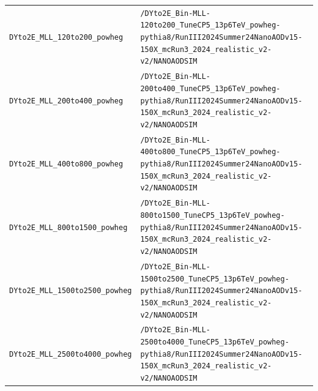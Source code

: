 \begin{longtable}{@{}>{\RaggedRight\arraybackslash}p{} >{\RaggedRight\arraybackslash}p{}@{}}
\addlinespace[2pt]
\texttt{DYto2E\_\allowbreak{}MLL\_\allowbreak{}120to200\_\allowbreak{}powheg} & \texttt{/\allowbreak{}DYto2E\_\allowbreak{}Bin-\allowbreak{}MLL-\allowbreak{}120to200\_\allowbreak{}TuneCP5\_\allowbreak{}13p6TeV\_\allowbreak{}powheg-\allowbreak{}pythia8/\allowbreak{}RunIII2024Summer24NanoAODv15-\allowbreak{}150X\_\allowbreak{}mcRun3\_\allowbreak{}2024\_\allowbreak{}realistic\_\allowbreak{}v2-\allowbreak{}v2/\allowbreak{}NANOAODSIM} \\
\addlinespace[2pt]
\texttt{DYto2E\_\allowbreak{}MLL\_\allowbreak{}200to400\_\allowbreak{}powheg} & \texttt{/\allowbreak{}DYto2E\_\allowbreak{}Bin-\allowbreak{}MLL-\allowbreak{}200to400\_\allowbreak{}TuneCP5\_\allowbreak{}13p6TeV\_\allowbreak{}powheg-\allowbreak{}pythia8/\allowbreak{}RunIII2024Summer24NanoAODv15-\allowbreak{}150X\_\allowbreak{}mcRun3\_\allowbreak{}2024\_\allowbreak{}realistic\_\allowbreak{}v2-\allowbreak{}v2/\allowbreak{}NANOAODSIM} \\
\addlinespace[2pt]
\texttt{DYto2E\_\allowbreak{}MLL\_\allowbreak{}400to800\_\allowbreak{}powheg} & \texttt{/\allowbreak{}DYto2E\_\allowbreak{}Bin-\allowbreak{}MLL-\allowbreak{}400to800\_\allowbreak{}TuneCP5\_\allowbreak{}13p6TeV\_\allowbreak{}powheg-\allowbreak{}pythia8/\allowbreak{}RunIII2024Summer24NanoAODv15-\allowbreak{}150X\_\allowbreak{}mcRun3\_\allowbreak{}2024\_\allowbreak{}realistic\_\allowbreak{}v2-\allowbreak{}v2/\allowbreak{}NANOAODSIM} \\
\addlinespace[2pt]
\texttt{DYto2E\_\allowbreak{}MLL\_\allowbreak{}800to1500\_\allowbreak{}powheg} & \texttt{/\allowbreak{}DYto2E\_\allowbreak{}Bin-\allowbreak{}MLL-\allowbreak{}800to1500\_\allowbreak{}TuneCP5\_\allowbreak{}13p6TeV\_\allowbreak{}powheg-\allowbreak{}pythia8/\allowbreak{}RunIII2024Summer24NanoAODv15-\allowbreak{}150X\_\allowbreak{}mcRun3\_\allowbreak{}2024\_\allowbreak{}realistic\_\allowbreak{}v2-\allowbreak{}v2/\allowbreak{}NANOAODSIM} \\
\addlinespace[2pt]
\texttt{DYto2E\_\allowbreak{}MLL\_\allowbreak{}1500to2500\_\allowbreak{}powheg} & \texttt{/\allowbreak{}DYto2E\_\allowbreak{}Bin-\allowbreak{}MLL-\allowbreak{}1500to2500\_\allowbreak{}TuneCP5\_\allowbreak{}13p6TeV\_\allowbreak{}powheg-\allowbreak{}pythia8/\allowbreak{}RunIII2024Summer24NanoAODv15-\allowbreak{}150X\_\allowbreak{}mcRun3\_\allowbreak{}2024\_\allowbreak{}realistic\_\allowbreak{}v2-\allowbreak{}v2/\allowbreak{}NANOAODSIM} \\
\addlinespace[2pt]
\texttt{DYto2E\_\allowbreak{}MLL\_\allowbreak{}2500to4000\_\allowbreak{}powheg} & \texttt{/\allowbreak{}DYto2E\_\allowbreak{}Bin-\allowbreak{}MLL-\allowbreak{}2500to4000\_\allowbreak{}TuneCP5\_\allowbreak{}13p6TeV\_\allowbreak{}powheg-\allowbreak{}pythia8/\allowbreak{}RunIII2024Summer24NanoAODv15-\allowbreak{}150X\_\allowbreak{}mcRun3\_\allowbreak{}2024\_\allowbreak{}realistic\_\allowbreak{}v2-\allowbreak{}v2/\allowbreak{}NANOAODSIM} \\

\end{longtable}
